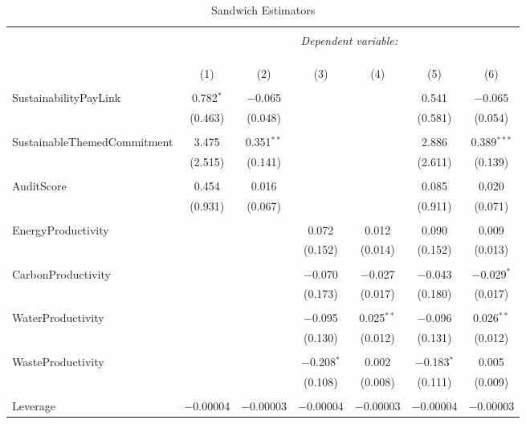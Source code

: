 \documentclass[12pt,]{article}
\begin{document}
\begin{table}[h] \centering 
  \caption{Sandwich Estimators} 
  \label{Sand} 
\begin{tabular}{@{\extracolsep{5pt}}lcccccc} 
\\[-1.8ex]\hline 
\hline \\[-1.8ex] 
 & \multicolumn{6}{c}{\textit{Dependent variable:}} \\ 
\cline{2-7} 
\\[-1.8ex] & \multicolumn{6}{c}{ } \\ 
\\[-1.8ex] & (1) & (2) & (3) & (4) & (5) & (6)\\ 
\hline \\[-1.8ex] 
 SustainabilityPayLink & 0.782$^{*}$ & $-$0.065 &  &  & 0.541 & $-$0.065 \\ 
  & (0.463) & (0.048) &  &  & (0.581) & (0.054) \\ 
  & & & & & & \\ 
 SustainableThemedCommitment & 3.475 & 0.351$^{**}$ &  &  & 2.886 & 0.389$^{***}$ \\ 
  & (2.515) & (0.141) &  &  & (2.611) & (0.139) \\ 
  & & & & & & \\ 
 AuditScore & 0.454 & 0.016 &  &  & 0.085 & 0.020 \\ 
  & (0.931) & (0.067) &  &  & (0.911) & (0.071) \\ 
  & & & & & & \\ 
 EnergyProductivity &  &  & 0.072 & 0.012 & 0.090 & 0.009 \\ 
  &  &  & (0.152) & (0.014) & (0.152) & (0.013) \\ 
  & & & & & & \\ 
 CarbonProductivity &  &  & $-$0.070 & $-$0.027 & $-$0.043 & $-$0.029$^{*}$ \\ 
  &  &  & (0.173) & (0.017) & (0.180) & (0.017) \\ 
  & & & & & & \\ 
 WaterProductivity &  &  & $-$0.095 & 0.025$^{**}$ & $-$0.096 & 0.026$^{**}$ \\ 
  &  &  & (0.130) & (0.012) & (0.131) & (0.012) \\ 
  & & & & & & \\ 
 WasteProductivity &  &  & $-$0.208$^{*}$ & 0.002 & $-$0.183$^{*}$ & 0.005 \\ 
  &  &  & (0.108) & (0.008) & (0.111) & (0.009) \\ 
  & & & & & & \\ 
 Leverage & $-$0.00004 & $-$0.00003 & $-$0.00004 & $-$0.00003 & $-$0.00004 & $-$0.00003 \\ 

\end{tabular}
\end{table}
\end{document}
